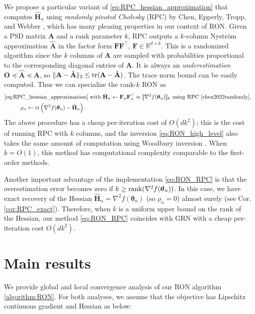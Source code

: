 \documentclass[11pt]{amsart}
\theoremstyle{plain}
\theoremstyle{definition}
\theoremstyle{remark}
\def\R{\mathbb{R}}
\def\bF{\mathbf{F}}
\def\H{\mathbf{H}}
\def\A{\mathbf{A}}
\def\tr{\textup{tr}}
\def\param{\boldsymbol{\theta}}
\begin{document}
 
We propose a particular variant of \eqref{eq:RPC_hessian_approximation} that computes $\hat{\H}_{n}$ using \textit{randomly pivoted Cholesky} (RPC) by Chen, Epperly, Tropp, and Webber \cite{chen2022randomly}, which has many pleasing properties in our context of RON. Given a PSD matrix $\A$ and a rank parameter $k$, RPC outputs a $k$-column Nystr\"{o}m approximation 
\cite[Sec. 19.2]{martinsson2020randomized} $\hat{\A}$ in the factor form $\bF\bF^{\top}$, $\bF\in \R^{d\times k}$. This is a randomized algorithm since the $k$ columns of $\A$ are sampled with probabilities proportional to the corresponding diagonal entries of $\A$. It is always an \textit{underestimation} $\mathbf{O}\preceq \hat{\A}\preceq \A$, so $\| \A-\hat{\A} \|_{2}\le \tr(\A-\hat{\A})$. The trace norm bound can be easily computed. Thus we can specialize the rank-$k$ RON as 
\begin{align}\label{eq:RON_RPC}
&\textup{\eqref{eq:RPC_hessian_approximation} with   }\hat{\H}_{n}\leftarrow \bF_{n}\bF_{n}^{\top} \approx \llbracket \nabla^{2} f(\param_{n})  \rrbracket_{k} \,\,  \textup{using RPC \cite{chen2022randomly}},\\
&\hspace{1cm}  \rho_{n}\leftarrow \tr\left( \nabla^{2} f(\param_{n}) - \hat{\H}_{n} \right). \nonumber
\end{align}
The above procedure has a cheap per-iteration cost of $O(d k^{2})$; this is the cost of running RPC with $k$ columns, and the inversion \eqref{eq:RON_high_level} also takes the same amount of computation using Woodbury inversion \cite{woodbury1950inverting}. When $k=O(1)$, this method has computational complexity comparable to the first-order methods. 


Another important advantage of the implementation \eqref{eq:RON_RPC} is that the overestimation error becomes zero if $k\ge \textup{rank}(\nabla^{2} f(\param_{n}))$. In this case, we have exact recovery of the Hessian $\hat{\H}_{n}=\nabla^{2} f(\param_{n})$ (so $\rho_{n}=0$) almost surely (see Cor. \ref{cor:RPC_exact}).  Therefore, when $k$ is a uniform upper bound on the rank of the Hessian, our method \eqref{eq:RON_RPC} coincides with GRN \cite{mishchenko2023regularized} with a cheap per-iteration cost $O(dk^{2})$.

\section{Main results}
\label{sec:main}
We provide global and local convergence analysis of our RON algorithm \ref{algorithm:RON}. For both analyses, we assume that the objective has Lipschitz continuous gradient and Hessian as below:
\end{document}
